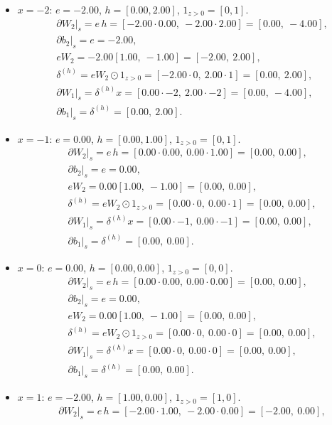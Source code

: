 \documentclass[11pt]{article}
\begin{document}
\begin{itemize}
\item $x=-2$: $e=-2.00$, $h=[0.00, 2.00]$, $1_{z>0}=[0,1]$.
\begin{align*}
&\partial W_2\big|_s = e\,h = [-2.00\cdot0.00,\ -2.00\cdot2.00] = [0.00,\ -4.00],\\
&\partial b_2\big|_s = e = -2.00,\\
&eW_2 = -2.00[1.00,\ -1.00] = [-2.00,\ 2.00],\\
&\delta^{(h)} = eW_2 \odot 1_{z>0} = [-2.00\cdot0,\ 2.00\cdot1] = [0.00,\ 2.00],\\
&\partial W_1\big|_s = \delta^{(h)} x = [0.00\cdot-2,\ 2.00\cdot-2] = [0.00,\ -4.00],\\
&\partial b_1\big|_s = \delta^{(h)} = [0.00,\ 2.00].
\end{align*}
\item $x=-1$: $e=0.00$, $h=[0.00, 1.00]$, $1_{z>0}=[0,1]$.
\begin{align*}
&\partial W_2\big|_s = e\,h = [0.00\cdot0.00,\ 0.00\cdot1.00] = [0.00,\ 0.00],\\
&\partial b_2\big|_s = e = 0.00,\\
&eW_2 = 0.00[1.00,\ -1.00] = [0.00,\ 0.00],\\
&\delta^{(h)} = eW_2 \odot 1_{z>0} = [0.00\cdot0,\ 0.00\cdot1] = [0.00,\ 0.00],\\
&\partial W_1\big|_s = \delta^{(h)} x = [0.00\cdot-1,\ 0.00\cdot-1] = [0.00,\ 0.00],\\
&\partial b_1\big|_s = \delta^{(h)} = [0.00,\ 0.00].
\end{align*}
\item $x=0$: $e=0.00$, $h=[0.00, 0.00]$, $1_{z>0}=[0,0]$.
\begin{align*}
&\partial W_2\big|_s = e\,h = [0.00\cdot0.00,\ 0.00\cdot0.00] = [0.00,\ 0.00],\\
&\partial b_2\big|_s = e = 0.00,\\
&eW_2 = 0.00[1.00,\ -1.00] = [0.00,\ 0.00],\\
&\delta^{(h)} = eW_2 \odot 1_{z>0} = [0.00\cdot0,\ 0.00\cdot0] = [0.00,\ 0.00],\\
&\partial W_1\big|_s = \delta^{(h)} x = [0.00\cdot0,\ 0.00\cdot0] = [0.00,\ 0.00],\\
&\partial b_1\big|_s = \delta^{(h)} = [0.00,\ 0.00].
\end{align*}
\item $x=1$: $e=-2.00$, $h=[1.00, 0.00]$, $1_{z>0}=[1,0]$.
\begin{align*}
&\partial W_2\big|_s = e\,h = [-2.00\cdot1.00,\ -2.00\cdot0.00] = [-2.00,\ 0.00],\\

\end{align*}
\end{itemize}
\end{document}
